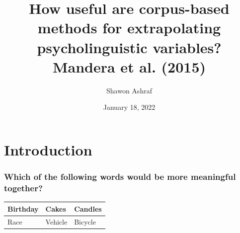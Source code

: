 \documentclass{beamer}
\title[Short title]{How useful are corpus-based methods for extrapolating psycholinguistic variables? Mandera et al. (2015)} %
\author{Shawon Ashraf} %
\institute[IMS] %
{
Universität Stuttgart \\ %
}
\date{January 18, 2022} %
\begin{document}
\begin{frame}
\titlepage %
\end{frame}



\section{Introduction} %


\begin{frame}
\frametitle{Which of the following words would be more meaningful together?}
\begin{table}[]
\begin{tabular}{@{}lll@{}}
\toprule
Birthday & Cakes   & Candles \\ \midrule
Race     & Vehicle & Bicycle \\ \bottomrule
\end{tabular}
\end{table}
\end{frame}
\end{document}
